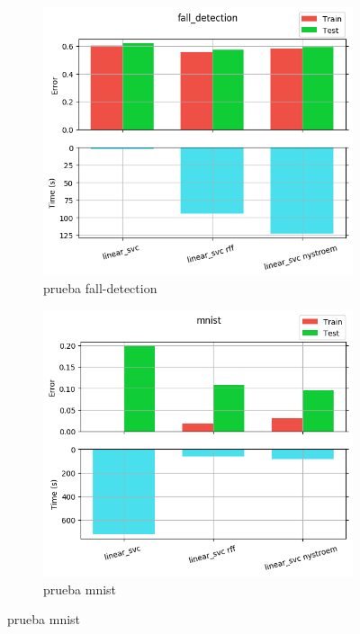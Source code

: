 \begin{figure}[ht]
  \centering
  \begin{subfigure}[b]{0.5\linewidth}
    \centering\captionsetup{width=.8\linewidth}\includegraphics[width=\imgscale\linewidth]{Figures/2_5/fall_detection}
    \caption{prueba fall-detection}
    \label{fig:2_5_fall_detection}
  \end{subfigure}%
  \begin{subfigure}[b]{0.5\linewidth}
    \centering\captionsetup{width=.8\linewidth}\includegraphics[width=\imgscale\linewidth]{Figures/2_5/mnist}
    \caption{prueba mnist}
    \label{fig:2_5_mnist}
  \end{subfigure}
\end{figure}


